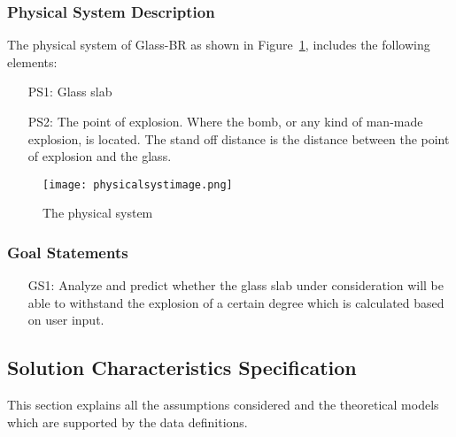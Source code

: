 \documentclass[12pt]{article}
\begin{document}
\subsubsection{Physical System Description}
\label{Sec:PSD}
The physical system of Glass-BR as shown in Figure~\ref{Figure:Tps}, includes the following elements:
\begin{itemize}
\item[PS1:]Glass slab
\item[PS2:]The point of explosion. Where the bomb, or any kind of man-made explosion, is located. The stand off distance is the distance between the point of explosion and the glass.
\end{itemize}
\begin{figure}
\begin{center}
\texttt{[image: physicalsystimage.png]}
\caption{The physical system}
\label{Figure:Tps}
\end{center}
\end{figure}
\subsubsection{Goal Statements}
\label{Sec:GSs}
\begin{itemize}
\item[GS1:]Analyze and predict whether the glass slab under consideration will be able to withstand the explosion of a certain degree which is calculated based on user input.
\end{itemize}
\subsection{Solution Characteristics Specification}
\label{Sec:SCS}
This section explains all the assumptions considered and the theoretical models which are supported by the data definitions.
\end{document}
